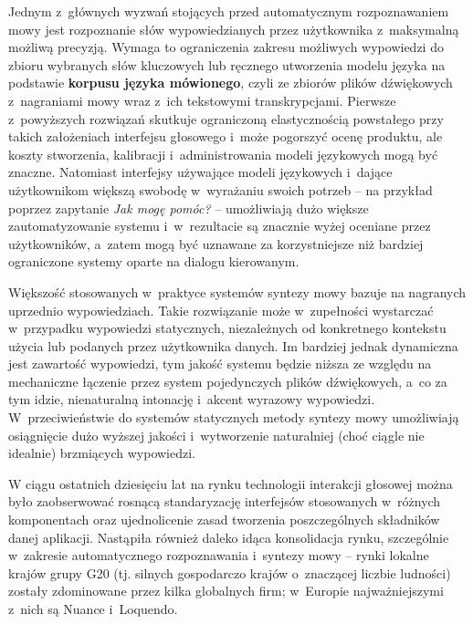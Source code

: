 \begin{multicols}{2}
Jednym z~głównych wyzwań stojących przed automatycznym
rozpoznawaniem mowy jest rozpoznanie słów wypowiedzianych przez
użytkownika z~maksymalną możliwą precyzją. Wymaga to ograniczenia
zakresu możliwych wypowiedzi do zbioru wybranych słów kluczowych
lub ręcznego utworzenia modelu języka na podstawie \textbf{korpusu
języka mówionego}, czyli ze zbiorów plików dźwiękowych
z~nagraniami mowy wraz z~ich tekstowymi transkrypcjami. Pierwsze
z~powyższych rozwiązań skutkuje ograniczoną elastycznością
powstałego przy takich założeniach interfejsu głosowego i~może
pogorszyć ocenę produktu, ale koszty stworzenia, kalibracji
i~administrowania modeli językowych mogą być znaczne. Natomiast
interfejsy używające modeli językowych i~dające użytkownikom
większą swobodę w~wyrażaniu swoich potrzeb – na przykład
poprzez zapytanie \emph{Jak mogę pomóc?} – umożliwiają dużo
większe zautomatyzowanie systemu i~w~rezultacie są znacznie wyżej
oceniane przez użytkowników, a~zatem mogą być uznawane za
korzystniejsze niż bardziej ograniczone systemy oparte na dialogu
kierowanym. 

Większość stosowanych w~praktyce systemów syntezy mowy bazuje na
nagranych uprzednio wypowiedziach. Takie rozwiązanie może
w~zupełności wystarczać w~przypadku wypowiedzi statycznych,
niezależnych od konkretnego kontekstu użycia lub podanych przez
użytkownika danych. Im bardziej jednak dynamiczna jest zawartość
wypowiedzi, tym jakość systemu będzie niższa ze względu na
mechaniczne łączenie przez system pojedynczych plików
dźwiękowych, a~co za tym idzie, nienaturalną intonację i~akcent
wyrazowy wypowiedzi. W~przeciwieństwie do systemów statycznych
metody syntezy mowy umożliwiają osiągnięcie dużo wyższej
jakości i~wytworzenie naturalniej (choć ciągle nie idealnie)
brzmiących wypowiedzi. 


W ciągu ostatnich dziesięciu lat na rynku technologii interakcji
głosowej można było zaobserwować rosnącą standaryzację
interfejsów stosowanych w~różnych komponentach oraz ujednolicenie
zasad tworzenia poszczególnych składników danej aplikacji.
Nastąpiła również daleko idąca konsolidacja rynku, szczególnie
w~zakresie automatycznego rozpoznawania i~syntezy mowy – rynki
lokalne krajów grupy G20 (tj. silnych gospodarczo krajów
o~znaczącej liczbie ludności) zostały zdominowane przez kilka
globalnych firm; w~Europie najważniejszymi z~nich są Nuance
i~Loquendo. 


\end{multicols}
